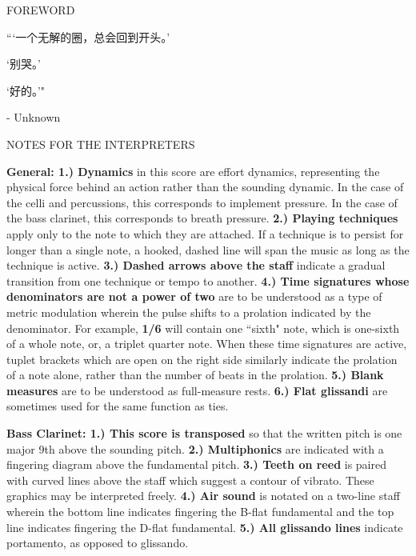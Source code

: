\documentclass[12pt]{article}
\begin{document}
\begin{center}
\huge FOREWORD
\end{center}

\vspace*{2\baselineskip}

\begingroup
\begin{center}
{\setmainfont{Source Han Serif SC}\selectfont
“`一个无解的圈，总会回到开头。'

 

`别哭。'

 

`好的。'"
}
\rightskip\leftskip
\phantom{text} \hfill - Unknown
\end{center}
\endgroup

\begin{center}
\huge NOTES FOR THE INTERPRETERS
\end{center}

\vspace*{2\baselineskip}

\begingroup
\textbf{General: 1.) Dynamics} in this score are effort dynamics, representing the physical force behind an action rather than the sounding dynamic. In the case of the celli and percussions, this corresponds to implement pressure. In the case of the bass clarinet, this corresponds to breath pressure. \textbf{2.) Playing techniques} apply only to the note to which they are attached. If a technique is to persist for longer than a single note, a hooked, dashed line will span the music as long as the technique is active. \textbf{3.) Dashed arrows above the staff} indicate a gradual transition from one technique or tempo to another. \textbf{4.) Time signatures whose denominators are not a power of two} are to be understood as a type of metric modulation wherein the pulse shifts to a prolation indicated by the denominator. For example, \textbf{1/6} will contain one ``sixth" note, which is one-sixth of a whole note, or, a triplet quarter note. When these time signatures are active, tuplet brackets which are open on the right side similarly indicate the prolation of a note alone, rather than the number of beats in the prolation. \textbf{5.) Blank measures} are to be understood as full-measure rests. \textbf{6.) Flat glissandi} are sometimes used for the same function as ties. \\
\endgroup

\begingroup
\textbf{Bass Clarinet: 1.) This score is transposed} so that the written pitch is one major 9th above the sounding pitch. \textbf{2.) Multiphonics} are indicated with a fingering diagram above the fundamental pitch. \textbf{3.) Teeth on reed} is paired with curved lines above the staff which suggest a contour of vibrato. These graphics may be interpreted freely. \textbf{4.) Air sound} is notated on a two-line staff wherein the bottom line indicates fingering the B-flat fundamental and the top line indicates fingering the D-flat fundamental. \textbf{5.) All glissando lines} indicate portamento, as opposed to glissando. \\
\endgroup
\end{document}
